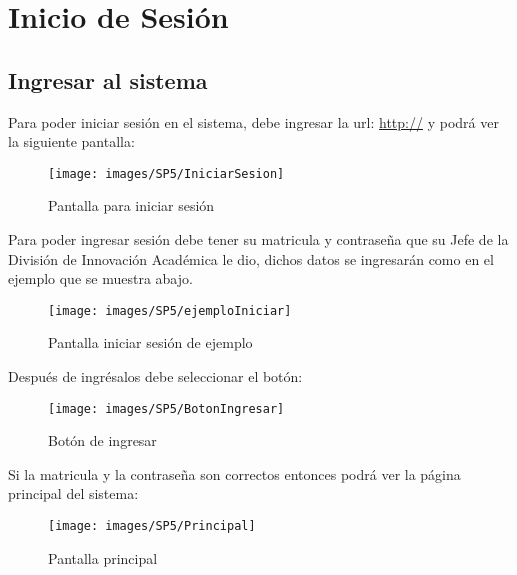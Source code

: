 \chapter{Inicio de Sesión}
    
    \section{Ingresar al sistema}
        Para poder iniciar sesión en el sistema, debe ingresar la url: \url{http://} y podrá ver la siguiente pantalla:
        
        \begin{figure}[!hbtp]
            \centering
            \hypertarget{iniciarS}{\texttt{[image: images/SP5/IniciarSesion]}}
            \caption{Pantalla para iniciar sesión}
        \end{figure}
        
        Para poder ingresar sesión debe tener su matricula y contraseña que su Jefe de la División de Innovación Académica le dio, dichos datos se ingresarán como en el ejemplo que se muestra abajo.
        
        \begin{figure}[!hbtp]
            \centering
            \hypertarget{iniciarL}{\texttt{[image: images/SP5/ejemploIniciar]}}
            \caption{Pantalla iniciar sesión de ejemplo}
        \end{figure}
        
        Después de ingrésalos debe seleccionar el botón:
        
        \begin{figure}[!hbtp]
            \centering
            \hypertarget{BotonIng}{\texttt{[image: images/SP5/BotonIngresar]}}
            \caption{Botón de ingresar}
            \label{consultarrh}
        \end{figure}
        
        Si la matricula y la contraseña son correctos entonces podrá ver la página principal del sistema:
    
        \begin{figure}[!hbtp]
            \centering
            \hypertarget{Principal}{\texttt{[image: images/SP5/Principal]}}
            \caption{Pantalla principal}
        \end{figure}
        
